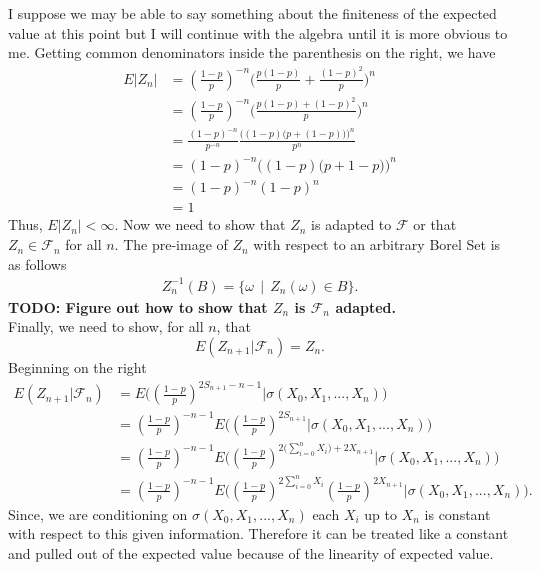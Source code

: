 \documentclass[10pt]{amsart}
\begin{document}
I suppose we may be able to say something about the finiteness of the expected value at this point but I will continue with the algebra until it is more obvious to me.
Getting common denominators inside the parenthesis on the right, we have
\begin{align*}
E|Z_n| &= \left(\frac{1-p}{p} \right)^{-n} \Bigg(\frac{p(1-p)}{p} + \frac{(1-p)^2}{p}\Bigg)^n \\
	&= \left(\frac{1-p}{p} \right)^{-n} \Bigg(\frac{p(1-p)+ (1-p)^2}{p}\Bigg)^n \\
	&= \frac{(1-p)^{-n}}{p^{-n}} \frac{\bigg((1 - p)\big(p + (1-p)\big)\bigg)^n}{p^n} \\
	&= (1-p)^{-n} \bigg( (1 - p) \big(p + 1 -p \big) \bigg)^n \\
	&= (1-p)^{-n} (1 - p)^n \\
	&= 1
\end{align*}
Thus, $E |Z_n| < \infty$.
Now we need to show that $Z_n$ is adapted to $\mathcal F$ or that $Z_n \in \mathcal F_n$ for all $n$.
The pre-image of $Z_n$ with respect to an arbitrary Borel Set is as follows
\begin{align*}
Z_n^{-1}(B) = \{\omega \:\: | \:\: Z_n(\omega) \in B\}.
\end{align*}
\textbf{TODO: Figure out how to show that $Z_n$ is $\mathcal F_n$ adapted.} \\
Finally, we need to show, for all $n$, that
$$ E (Z_{n + 1} | \mathcal F_n) = Z_n. $$
Beginning on the right
\begin{align*}
E (Z_{n + 1} | \mathcal F_n) &= E \Bigg(\left(\frac{1-p}{p} \right)^{2S_{n + 1} - n - 1} \Bigg| \sigma(X_0, X_1, ...,  X_n)\Bigg) \\
	&= \left(\frac{1-p}{p} \right)^{- n - 1} E \Bigg(\left(\frac{1-p}{p} \right)^{2S_{n + 1}} \Bigg| \sigma(X_0, X_1, ...,  X_n)\Bigg) \\
	&= \left(\frac{1-p}{p} \right)^{- n - 1} E \Bigg(\left(\frac{1-p}{p} \right)^{2\big(\sum_{i=0}^{n} X_i\big) + 2X_{n + 1}} \Bigg| \sigma(X_0, X_1, ...,  X_n)\Bigg) \\
	&= \left(\frac{1-p}{p} \right)^{- n - 1} E \Bigg(\left(\frac{1-p}{p} \right)^{2\sum_{i=0}^{n} X_i} \left(\frac{1-p}{p} \right)^{2X_{n + 1}} \Bigg| \sigma(X_0, X_1, ...,  X_n)\Bigg).
\end{align*}
Since, we are conditioning on $\sigma(X_0, X_1, ...,  X_n)$ each $X_i$ up to $X_n$ is constant with respect to this given information.
Therefore it can be treated like a constant and pulled out of the expected value because of the linearity of expected value.
\end{document}
